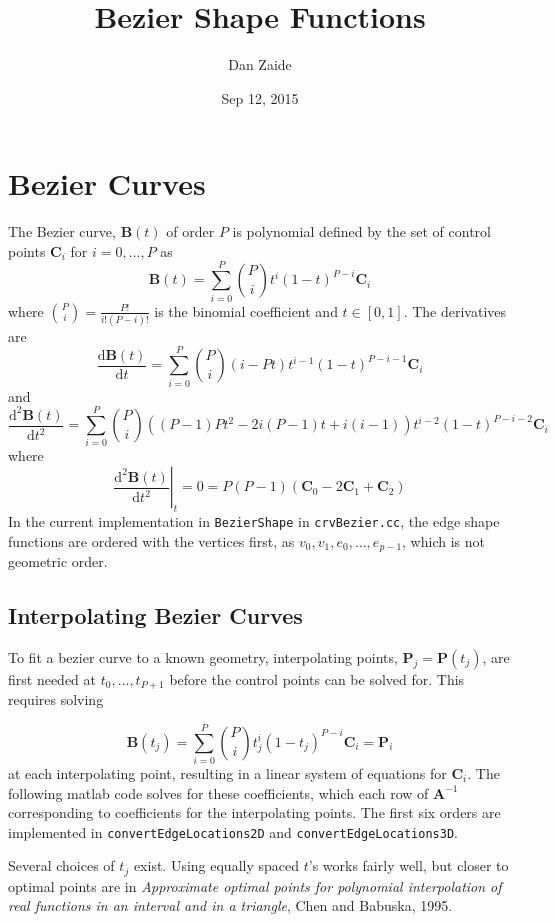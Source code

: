 \documentclass{article}
\title{Bezier Shape Functions}
\author{Dan Zaide}
\date{Sep 12, 2015}
\begin{document}
\maketitle

\section{Bezier Curves}
The Bezier curve, $\mathbf{B}(t)$ of order $P$ is polynomial defined by the set of control points $\mathbf{C}_i$ for $i = 0,\ldots,P$ as 
\[
\mathbf{B}(t) = \displaystyle \sum_{i=0}^P {P \choose i}t^i(1-t)^{P-i}\mathbf{C}_i
\]
where ${P \choose i}= \frac{P!}{i!(P-i)!}$ is the binomial coefficient and $ t \in [0,1]$. The derivatives are
\[
\frac{\mathrm{d} \mathbf{B}(t)}{\mathrm{d} t} = \displaystyle \sum_{i=0}^P {P \choose i}(i-Pt)t^{i-1}(1-t)^{P-i-1}\mathbf{C}_i
\]
and
\[
\frac{\mathrm{d}^2 \mathbf{B}(t)}{\mathrm{d} t^2} = \displaystyle \sum_{i=0}^P {P \choose i}((P-1)Pt^2-2i(P-1)t+i(i-1))t^{i-2}(1-t)^{P-i-2}\mathbf{C}_i
\]
where
\[\left.\frac{\mathrm{d}^2 \mathbf{B}(t)}{\mathrm{d} t^2}\right|_t=0 = P(P-1)(\mathbf{C}_0-2\mathbf{C}_1+\mathbf{C}_2)\]
In the current implementation in \texttt{BezierShape} in \texttt{crvBezier.cc}, the edge shape functions are ordered with the vertices first, as $v_0,v_1,e_0,\ldots,e_{p-1}$, which is not geometric order.
\subsection{Interpolating Bezier Curves}
To fit a bezier curve to a known geometry, interpolating points, $\mathbf{P}_j = \mathbf{P}(t_j)$, are first needed at $t_0,\ldots, t_{P+1}$ before the control points can be solved for. This requires solving

\[
\mathbf{B}(t_j) = \displaystyle \sum_{i=0}^P {P \choose i}t_j^i(1-t_j)^{P-i}\mathbf{C}_i = \mathbf{P}_i
\]
at each interpolating point, resulting in a linear system of equations for $\mathbf{C}_i$. The following matlab code solves for these coefficients, which each row of $\mathbf{A}^{-1}$ corresponding to coefficients for the interpolating points. The first six orders are implemented in \texttt{convertEdgeLocations2D} and \texttt{convertEdgeLocations3D}.

Several choices of $t_j$ exist. Using equally spaced $t$'s works fairly well, but closer to optimal points are in \textit{Approximate optimal points for polynomial interpolation of real functions in an interval and in a triangle}, Chen and Babuska, 1995.
\end{document}

